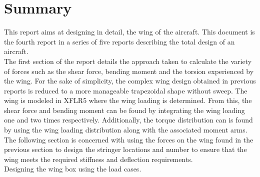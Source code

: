 \chapter{Summary}
This report aims at designing in detail, the wing of the aircraft. This document is the fourth report in a series of five reports describing the total design of an aircraft.\\

The first section of the report details the approach taken to calculate the variety of forces such as the shear force, bending moment and the torsion experienced by the wing. For the sake of simplicity, the complex wing design obtained in previous reports is reduced to a more manageable trapezoidal shape without sweep. The wing is modeled in XFLR5 where the wing loading is determined. From this, the shear force and bending moment can be found by integrating the wing loading one and two times respectively. Additionally, the torque distribution can is found by using the wing loading distribution along with the associated moment arms.\\

The following section is concerned with using the forces on the wing found in the previous section to design the stringer locations and number to ensure that the wing meets the required stiffness and deflection requirements.
\\

Designing the wing box using the load cases.\\


